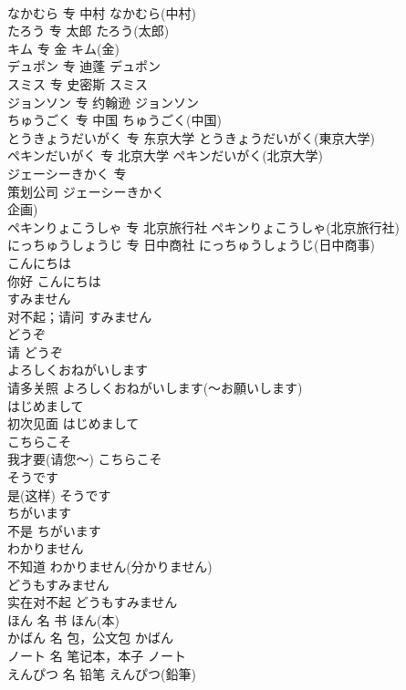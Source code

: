 \documentclass[8pt]{extreport}
\begin{document}
\begin{CJK}{UTF8}{min}
\\	なかむら	专	中村	なかむら(中村)	
\\	たろう	专	太郎	たろう(太郎)	
\\	キム	专	金	キム(金)	
\\	デュポン	专	迪蓬	デュポン	
\\	スミス	专	史密斯	スミス	
\\	ジョンソン	专	约翰逊	ジョンソン	
\\	ちゅうごく	专	中国	ちゅうごく(中国)	
\\	とうきょうだいがく	专	东京大学	とうきょうだいがく(東京大学)	
\\	ペキンだいがく	专	北京大学	ペキンだいがく(北京大学)	
\\	ジェーシーきかく	专	
\\	策划公司	ジェーシーきかく
\\	企画)	
\\	ペキンりょこうしゃ	专	北京旅行社	ペキンりょこうしゃ(北京旅行社)	
\\	にっちゅうしょうじ	专	日中商社	にっちゅうしょうじ(日中商事)	
\\	こんにちは	
\\	你好	こんにちは	
\\	すみません	
\\	对不起；请问	すみません	
\\	どうぞ	
\\	请	どうぞ	
\\	よろしくおねがいします	
\\	请多关照	よろしくおねがいします(～お願いします)	
\\	はじめまして	
\\	初次见面	はじめまして	
\\	こちらこそ	
\\	我才要(请您～)	こちらこそ	
\\	そうです	
\\	是(这样)	そうです	
\\	ちがいます	
\\	不是	ちがいます	
\\	わかりません	
\\	不知道	わかりません(分かりません)	
\\	どうもすみません	
\\	实在对不起	どうもすみません	
\\	ほん	名	书	ほん(本)	
\\	かばん	名	包，公文包	かばん	
\\	ノート	名	笔记本，本子	ノート	
\\	えんぴつ	名	铅笔	えんぴつ(鉛筆)	

\end{CJK}
\end{document}
